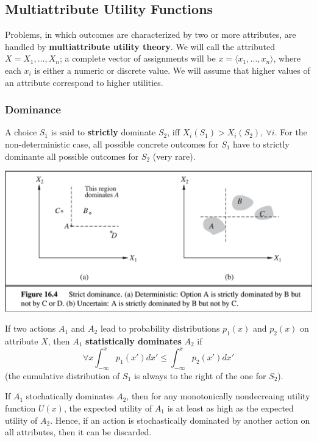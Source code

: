 \documentclass{scrartcl}
\begin{document}
\subsection{Multiattribute Utility Functions}
Problems, in which outcomes are characterized by two or more attributes, are handled by \textbf{multiattribute utility theory}. We will call the attributed \(X = X_1, \dots, X_n\); a complete vector of assignments will be \(x = \langle x_1, \dots, x_n \rangle\), where each \(x_i\) is either a numeric or discrete value. We will assume that higher values of an attribute correspond to higher utilities.

\subsubsection{Dominance}
A choice \(S_1\) is said to \textbf{strictly} dominate \(S_2\), iff \(X_i(S_1) > X_i(S_2), \ \forall i\). For the non-deterministic case, all possible concrete outcomes for \(S_1\) have to strictly dominante all possible outcomes for \(S_2\) (very rare).

\begin{center}
    \includegraphics[scale=0.4]{img/stricdom.png}
\end{center}

If two actions \(A_1\) and \(A_2\) lead to probability distributions \(p_1(x)\) and \(p_2(x)\) on attribute \(X\), then \(A_1\) \textbf{statistically dominates} \(A_2\) if
\[\forall x \int_{-\infty}^x p_1(x') dx' \leq \int_{-\infty}^x p_2(x')dx'\]
(the cumulative distribution of \(S_1\) is always to the right of the one for \(S_2\)).

If \(A_1\) stochatically dominates \(A_2\), then for any monotonically nondecreaing utility function \(U(x)\), the expected utility of \(A_1\) is at least as high as the expected utility of \(A_2\). Hence, if an action is stochastically dominated by another action on all attributes, then it can be discarded.
\end{document}
